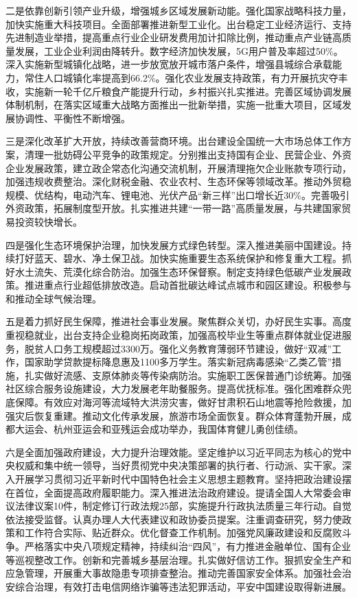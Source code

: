 \documentclass[10pt, UTF8]{ctexbook} %
\begin{document}
二是依靠创新引领产业升级，增强城乡区域发展新动能。强化国家战略科技力量，加快实施重大科技项目。全面部署推进新型工业化。出台稳定工业经济运行、支持先进制造业举措，提高重点行业企业研发费用加计扣除比例，推动重点产业链高质量发展，工业企业利润由降转升。数字经济加快发展，5G用户普及率超过50\%。深入实施新型城镇化战略，进一步放宽放开城市落户条件，增强县城综合承载能力，常住人口城镇化率提高到66.2\%。强化农业发展支持政策，有力开展抗灾夺丰收，实施新一轮千亿斤粮食产能提升行动，乡村振兴扎实推进。完善区域协调发展体制机制，在落实区域重大战略方面推出一批新举措，实施一批重大项目，区域发展协调性、平衡性不断增强。

三是深化改革扩大开放，持续改善营商环境。出台建设全国统一大市场总体工作方案，清理一批妨碍公平竞争的政策规定。分别推出支持国有企业、民营企业、外资企业发展政策，建立政企常态化沟通交流机制，开展清理拖欠企业账款专项行动，加强违规收费整治。深化财税金融、农业农村、生态环保等领域改革。推动外贸稳规模、优结构，电动汽车、锂电池、光伏产品“新三样”出口增长近30\%。完善吸引外资政策，拓展制度型开放。扎实推进共建“一带一路”高质量发展，与共建国家贸易投资较快增长。

四是强化生态环境保护治理，加快发展方式绿色转型。深入推进美丽中国建设。持续打好蓝天、碧水、净土保卫战。加快实施重要生态系统保护和修复重大工程。抓好水土流失、荒漠化综合防治。加强生态环保督察。制定支持绿色低碳产业发展政策。推进重点行业超低排放改造。启动首批碳达峰试点城市和园区建设。积极参与和推动全球气候治理。

五是着力抓好民生保障，推进社会事业发展。聚焦群众关切，办好民生实事。高度重视稳就业，出台支持企业稳岗拓岗政策，加强高校毕业生等重点群体就业促进服务，脱贫人口务工规模超过3300万。强化义务教育薄弱环节建设，做好“双减”工作，国家助学贷款提标降息惠及1100多万学生。落实新冠病毒感染“乙类乙管”措施，扎实做好流感、支原体肺炎等传染病防治。实施职工医保普通门诊统筹。加强社区综合服务设施建设，大力发展老年助餐服务。提高优抚标准。强化困难群众兜底保障。有效应对海河等流域特大洪涝灾害，做好甘肃积石山地震等抢险救援，加强灾后恢复重建。推动文化传承发展，旅游市场全面恢复。群众体育蓬勃开展，成都大运会、杭州亚运会和亚残运会成功举办，我国体育健儿勇创佳绩。

六是全面加强政府建设，大力提升治理效能。坚定维护以习近平同志为核心的党中央权威和集中统一领导，当好贯彻党中央决策部署的执行者、行动派、实干家。深入开展学习贯彻习近平新时代中国特色社会主义思想主题教育。坚持把政治建设摆在首位，全面提高政府履职能力。深入推进法治政府建设。提请全国人大常委会审议法律议案10件，制定修订行政法规25部，实施提升行政执法质量三年行动。自觉依法接受监督。认真办理人大代表建议和政协委员提案。注重调查研究，努力使政策和工作符合实际、贴近群众。优化督查工作机制。加强党风廉政建设和反腐败斗争。严格落实中央八项规定精神，持续纠治“四风”，有力推进金融单位、国有企业等巡视整改工作。创新和完善城乡基层治理。扎实做好信访工作。狠抓安全生产和应急管理，开展重大事故隐患专项排查整治。推动完善国家安全体系。加强社会治安综合治理，有效打击电信网络诈骗等违法犯罪活动，平安中国建设取得新进展。
\end{document}
